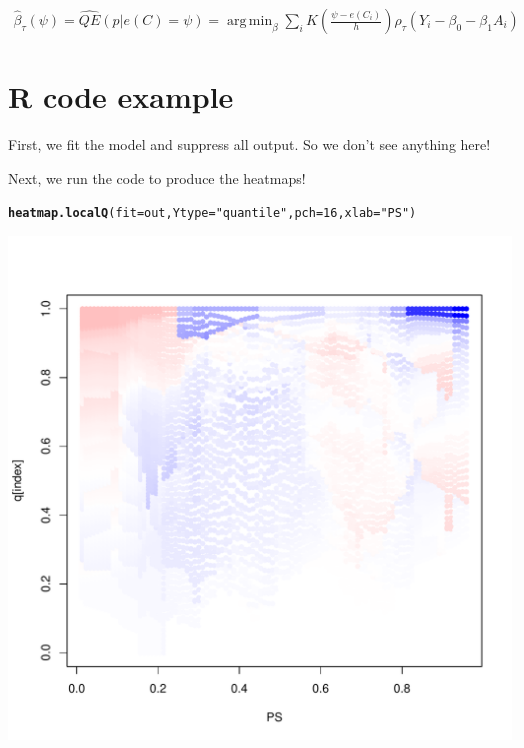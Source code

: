 \documentclass{article}\usepackage[]{graphicx}\usepackage[]{color}
\makeatletter
\def\maxwidth{ %
  \ifdim\Gin@nat@width>\linewidth
    \linewidth
  \else
    \Gin@nat@width
  \fi
}
\newcommand{\hlnum}[1]{\textcolor[rgb]{0.686,0.059,0.569}{#1}}%
\newcommand{\hlstr}[1]{\textcolor[rgb]{0.192,0.494,0.8}{#1}}%
\newcommand{\hlstd}[1]{\textcolor[rgb]{0.345,0.345,0.345}{#1}}%
\newcommand{\hlkwc}[1]{\textcolor[rgb]{0.333,0.667,0.333}{#1}}%
\newcommand{\hlkwd}[1]{\textcolor[rgb]{0.737,0.353,0.396}{\textbf{#1}}}%
\newenvironment{kframe}{%
 \def\at@end@of@kframe{}%
 \ifinner\ifhmode%
  \def\at@end@of@kframe{\end{minipage}}%
  \begin{minipage}{\columnwidth}%
 \fi\fi%
 \def\FrameCommand##1{\hskip\@totalleftmargin \hskip-\fboxsep
 \colorbox{shadecolor}{##1}\hskip-\fboxsep
     \hskip-\linewidth \hskip-\@totalleftmargin \hskip\columnwidth}%
 \MakeFramed {\advance\hsize-\width
   \@totalleftmargin\z@ \linewidth\hsize
   \@setminipage}}%
 {\par\unskip\endMakeFramed%
 \at@end@of@kframe}
\newenvironment{knitrout}{}{} %
\DeclareMathOperator*{\argmin}{arg\,min}
\def\betahat{{\widehat\beta}}
\makeatother
\begin{document}
\begin{align*}
  \betahat_\tau(\psi) = \widehat{QE}(p|e(C)=\psi) = \argmin_\beta \sum_i K( \frac{\psi-e(C_i)}{h}) \rho_\tau( Y_i - \beta_0 - \beta_1 A_i)
\end{align*}

\section{R code example}

First, we fit the model and suppress all output. So we don't see anything here!



Next, we run the code to produce the heatmaps!
\begin{knitrout}
\color{fgcolor}\begin{kframe}
\begin{alltt}
\hlkwd{heatmap.localQ}\hlstd{(}\hlkwc{fit}\hlstd{=out ,} \hlkwc{Ytype}\hlstd{=}\hlstr{"quantile"} \hlstd{,} \hlkwc{pch}\hlstd{=}\hlnum{16} \hlstd{,} \hlkwc{xlab}\hlstd{=}\hlstr{"PS"}\hlstd{)}
\end{alltt}
\end{kframe}

{\centering \includegraphics[width=\maxwidth]{figures/lalonde-heatmap-1} 

}



\end{knitrout}
\end{document}

